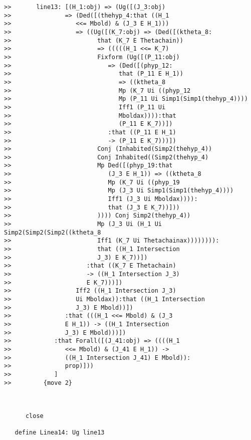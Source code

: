 \documentclass[12pt]{article}
\begin{document}
\begin{verbatim}
>>       line13: [(H_1:obj) => (Ug([(J_3:obj)
>>               => (Ded([(thehyp_4:that ((H_1
>>                  <<= Mbold) & (J_3 E H_1)))
>>                  => ((Ug([(K_7:obj) => (Ded([(ktheta_8:
>>                        that (K_7 E Thetachain))
>>                        => (((((H_1 <<= K_7)
>>                        Fixform (Ug([(P_11:obj)
>>                           => (Ded([(phyp_12:
>>                              that (P_11 E H_1))
>>                              => ((ktheta_8
>>                              Mp (K_7 Ui ((phyp_12
>>                              Mp (P_11 Ui Simp1(Simp1(thehyp_4))))
>>                              Iff1 (P_11 Ui
>>                              Mboldax)))):that
>>                              (P_11 E K_7))])
>>                           :that ((P_11 E H_1)
>>                           -> (P_11 E K_7)))])
>>                        Conj (Inhabited(Simp2(thehyp_4))
>>                        Conj Inhabited((Simp2(thehyp_4)
>>                        Mp Ded([(phyp_19:that
>>                           (J_3 E H_1)) => ((ktheta_8
>>                           Mp (K_7 Ui ((phyp_19
>>                           Mp (J_3 Ui Simp1(Simp1(thehyp_4))))
>>                           Iff1 (J_3 Ui Mboldax)))):
>>                           that (J_3 E K_7))]))
>>                        )))) Conj Simp2(thehyp_4))
>>                        Mp (J_3 Ui (H_1 Ui Simp2(Simp2(Simp2((ktheta_8
>>                        Iff1 (K_7 Ui Thetachainax)))))))):
>>                        that ((H_1 Intersection
>>                        J_3) E K_7))])
>>                     :that ((K_7 E Thetachain)
>>                     -> ((H_1 Intersection J_3)
>>                     E K_7)))])
>>                  Iff2 ((H_1 Intersection J_3)
>>                  Ui Mboldax)):that ((H_1 Intersection
>>                  J_3) E Mbold))])
>>               :that (((H_1 <<= Mbold) & (J_3
>>               E H_1)) -> ((H_1 Intersection
>>               J_3) E Mbold)))])
>>            :that Forall([(J_41:obj) => ((((H_1
>>               <<= Mbold) & (J_41 E H_1)) ->
>>               ((H_1 Intersection J_41) E Mbold)):
>>               prop)]))
>>            ]
>>         {move 2}



      close

   define Linea14: Ug line13


\end{verbatim}
\end{document}
